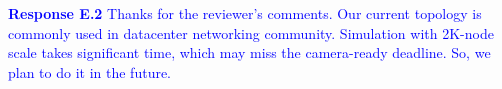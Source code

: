 \documentclass[12pt,one-column]{article}
\begin{document}
\noindent\textcolor{blue}{\textbf{Response E.2}
Thanks for the reviewer’s comments. 
Our current topology is commonly used in datacenter networking community.
Simulation with 2K-node scale takes significant time, which may miss the camera-ready deadline.  So, we plan to do it in the future.
} 







%
%
\end{document}

